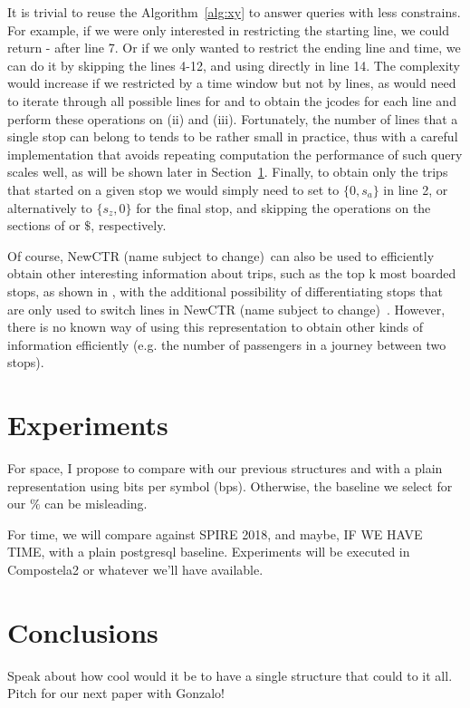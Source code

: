 \documentclass[runningheads]{llncs}
\newcommand{\ctr}{NewCTR (name subject to change)\ }
\begin{document}
It is trivial to reuse the Algorithm~\ref{alg:xy} to answer queries with less constrains. For example, if we were only interested in restricting the starting line, we could return - after line 7. Or if we only wanted to restrict the ending line and time, we can do it by skipping the lines 4-12, and using directly  in line 14. The complexity would increase if we restricted by a time window but not by lines, as would need to iterate through all possible lines for  and  to obtain the jcodes for each line and perform these operations on (ii) and (iii). Fortunately, the number of lines that a single stop can belong to tends to be rather small in practice, thus with a careful implementation that avoids repeating computation the performance of such query scales well, as will be shown later in Section~\ref{sec:exp}. Finally, to obtain only the trips that started on a given stop we would simply need to set  to $\{0,s_a\}$ in line 2, or alternatively to $\{s_z,0\}$ for the final stop, and skipping the operations on the sections of  or $\$$, respectively.

Of course, \ctr can also be used to efficiently obtain other interesting information about trips, such as the top k most boarded stops, as shown in \cite{brisaboa2018compact}, with the additional possibility of differentiating stops that are only used to switch lines in \ctr. However, there is no known way of using this representation to obtain other kinds of information efficiently (e.g. the number of passengers in a journey between two stops).

\section{Experiments}
\label{sec:exp}
For space, I propose to compare with our previous structures and with a plain representation using bits per symbol (bps). Otherwise, the baseline we select for our $\%$ can be misleading.

For time, we will compare against SPIRE 2018, and maybe, IF WE HAVE TIME, with a plain postgresql baseline. Experiments will be executed in Compostela2 or whatever we'll have available.

\section{Conclusions}
Speak about how cool would it be to have a single structure that could to it all. Pitch for our next paper with Gonzalo!
\end{document}
